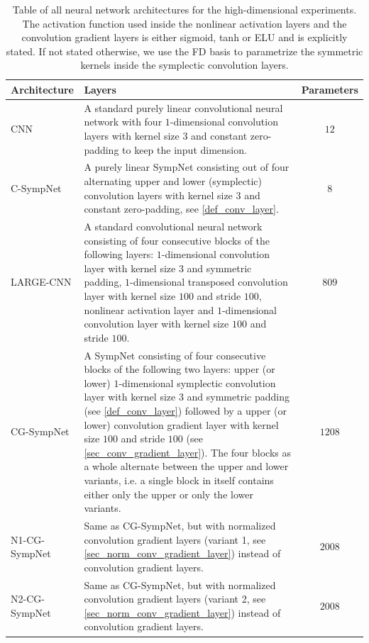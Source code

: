 \documentclass[twoside,a4paper]{article}
\begin{document}
\begin{table}
	\centering
	\begin{tabular}{lp{8cm}c}
		\toprule Architecture & Layers & Parameters \\
		\midrule CNN & 
		A standard purely linear convolutional neural network with four $1$-dimensional
		convolution layers with kernel size $3$ and constant zero-padding to keep the input dimension. 
		& $12$ \\
		C-SympNet & A purely linear SympNet consisting out of four alternating upper and lower
		(symplectic) convolution layers with kernel size $3$ and constant zero-padding,
		see \cref{def_conv_layer}. 
		& $8$ \\
		LARGE-CNN &
		A standard convolutional neural network consisting of four consecutive blocks of
		the following layers: $1$-dimensional convolution layer with kernel size $3$
		and symmetric padding, $1$-dimensional transposed convolution layer
		with kernel size $100$ and stride $100$, nonlinear activation layer
		and $1$-dimensional convolution layer with kernel size $100$ and stride $100$. 
		& $809$ \\
		CG-SympNet & 
		A SympNet consisting of four consecutive blocks of
		the following two layers: upper (or lower) $1$-dimensional symplectic convolution layer with
		kernel size $3$ and symmetric padding (see \cref{def_conv_layer}) 
		followed by a upper (or lower) convolution gradient layer
		with kernel size $100$ and stride $100$ (see \cref{sec_conv_gradient_layer}). 
		The four blocks as a whole alternate between
		the upper and lower variants, i.e. a single block in itself contains either only the upper or only
		the lower variants. 
		& $1208$ \\
		N1-CG-SympNet & Same as CG-SympNet, but with normalized convolution gradient layers
		(variant 1, see \cref{sec_norm_conv_gradient_layer}) instead of convolution gradient layers.
		& $2008$ \\
		N2-CG-SympNet & Same as CG-SympNet, but with normalized convolution gradient layers
		(variant 2, see \cref{sec_norm_conv_gradient_layer}) instead of convolution gradient layers.
		& $2008$ \\ \bottomrule
	\end{tabular}
	\caption{Table of all neural network architectures for the
	high-dimensional experiments. The activation function used inside the nonlinear activation layers
	and the convolution gradient layers is either sigmoid, tanh or ELU and is explicitly stated.
	If not stated otherwise, we use the FD basis to parametrize the symmetric kernels 
	inside the symplectic convolution layers.}\label{table_high_dim_arch}
\end{table}
\end{document}
